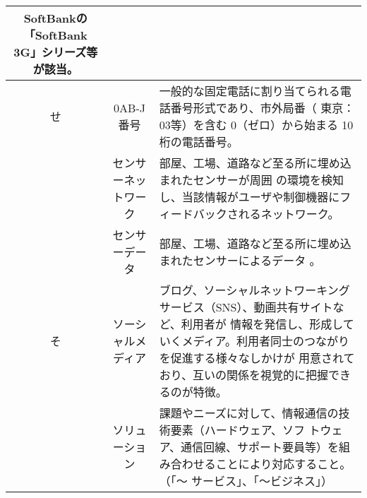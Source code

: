 \begin{table}[htb]
\begin{center}
\begin{tabular}{|c|c|p{10cm}|}
      SoftBankの「SoftBank 3G」シリーズ等が該当。 \\
      \hline
      せ & 0AB-J番号 & 一般的な固定電話に割り当てられる電話番号形式であり、市外局番（
        東京： 03等）を含む 0（ゼロ）から始まる 10桁の電話番号。 \\
      \cline{2-3}
      & センサーネットワーク & 部屋、工場、道路など至る所に埋め込まれたセンサーが周囲
      の環境を検知し、当該情報がユーザや制御機器にフィードバックされるネットワーク。
      \\
      \cline{2-3}
      & センサーデータ & 部屋、工場、道路など至る所に埋め込まれたセンサーによるデータ
      。\\
      \hline
      そ & ソーシャルメディア & 
      ブログ、ソーシャルネットワーキングサービス（SNS）、動画共有サイトなど、利用者が
      情報を発信し、形成していくメディア。利用者同士のつながりを促進する様々なしかけが
      用意されており、互いの関係を視覚的に把握できるのが特徴。 \\
      \cline{2-3}
      & ソリューション & 課題やニーズに対して、情報通信の技術要素（ハードウェア、ソフ
        トウェア、通信回線、サポート要員等）を組み合わせることにより対応すること。（「〜
          サービス」、「〜ビジネス」） \\
      \hline
    \end{tabular}
  \end{center}
\end{table}

